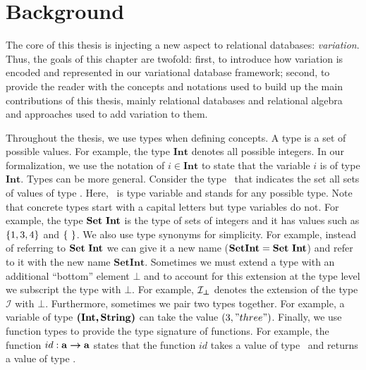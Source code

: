 \chapter{Background}
\label{ch:bg}


The core of this thesis is injecting a new aspect to relational databases: \emph{variation}.
Thus, the goals of this chapter are twofold: 
%
first, to introduce how variation is encoded and represented in our variational database framework;
%
second, to provide the reader with the concepts and notations
used to build up the main contributions of this thesis, mainly relational databases and
relational algebra
%
and approaches used to add variation to them.

%
Throughout the thesis, we use types when defining concepts. 
A type is a set of possible values. For example, the type $\mathbf{Int}$
denotes all possible integers. In our formalization, we use the notation of $i \in \mathbf{Int}$ to
state that the variable $i$ is of type $\mathbf{Int}$. 
%
Types can be more general. Consider the type \settype \typevar\ that indicates the set all sets
 of values of type \typevar. Here, \typevar\ is type variable and stands for any possible type. 
Note that concrete types start with a capital letters but type variables do not.
For example, the type $\settype {\mathbf{Int}}$ is the type of
sets of integers and it has values such as $\setDef {1,3,4}$ and $\setDef {\ }$.
We also use type synonyms for simplicity. For example, instead of referring to
$\settype {\mathbf{Int}}$ we can give it a new name ($\mathbf{SetInt}= \settype {\mathbf{Int}}$) 
and refer to it with the new name $\mathbf{SetInt}$.
%
Sometimes we must extend a type with an additional ``bottom'' element $\bot$ and to account for this
extension at the type level we subscript the type with $\bot$. For example, $\maybe {\mathcal{I}}$
denotes the extension of the type $\mathcal{I}$ with $\bot$.
%
Furthermore, sometimes we pair two types together. For example, a variable of type $\typepair{\mathbf{Int}} {\mathbf{String}}$ can take the value $(3, "three")$. 
%
Finally, we use function types to provide the type signature of functions. For example,
the function $id : \typevar \totype \typevar$ states that the function $id$ takes a value of
type \typevar\ and returns a value of type \typevar. 

